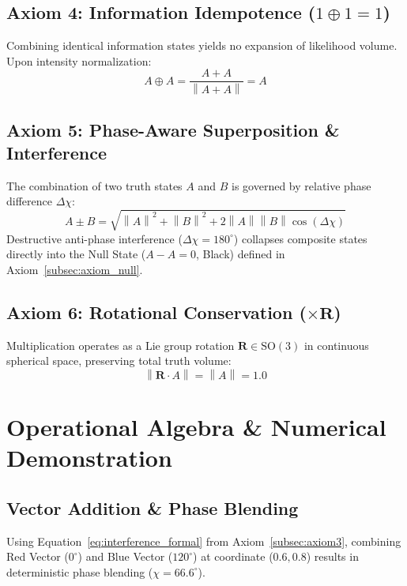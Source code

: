 \documentclass[12pt, a4paper]{article}
\providecommand{\norm}[1]{\left\lVert#1\right\rVert}
\begin{document}
\subsection{Axiom 4: Information Idempotence ($1 \oplus 1 = 1$)}
\label{subsec:axiom_idempotence}
Combining identical information states yields no expansion of likelihood volume. Upon intensity normalization:
\begin{equation}
    A \oplus A = \frac{A + A}{\norm{A + A}} = A
    \label{eq:idempotence_formal}
\end{equation}

\subsection{Axiom 5: Phase-Aware Superposition \& Interference}
\label{subsec:axiom_interference}
The combination of two truth states $A$ and $B$ is governed by relative phase difference $\Delta\chi$:
\begin{equation}
    A \pm B = \sqrt{\norm{A}^2 + \norm{B}^2 + 2\norm{A}\norm{B}\cos(\Delta\chi)}
    \label{eq:interference_formal}
\end{equation}
Destructive anti-phase interference ($\Delta\chi = 180^\circ$) collapses composite states directly into the Null State ($A - A = 0$, Black) defined in Axiom~\ref{subsec:axiom_null}.

\subsection{Axiom 6: Rotational Conservation (\texorpdfstring{$\times \mathbf{R}$}{x R})}
\label{subsec:axiom_rotation}
Multiplication operates as a Lie group rotation $\mathbf{R} \in \mathrm{SO}(3)$ in continuous spherical space, preserving total truth volume:
\begin{equation}
    \norm{\mathbf{R} \cdot A} = \norm{A} = 1.0
\end{equation}

\section{Operational Algebra \& Numerical Demonstration}

\subsection{Vector Addition \& Phase Blending}
Using Equation~\eqref{eq:interference_formal} from Axiom~\ref{subsec:axiom3}, combining Red Vector ($0^\circ$) and Blue Vector ($120^\circ$) at coordinate ($0.6, 0.8$) results in deterministic phase blending ($\chi = 66.6^\circ$).
\end{document}
